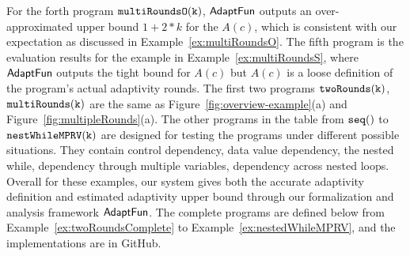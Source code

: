 For the forth program $\mathtt{multiRoundsO(k)}$, $\textsf{AdaptFun}$ outputs an over-approximated upper bound $1 + 2*k$ for the $A(c)$, which is consistent with our expectation as discussed in Example~\ref{ex:multiRoundsO}. 
The fifth program is the evaluation results for the example in Example~\ref{ex:multiRoundsS}, where $\textsf{AdaptFun}$ outputs the tight bound for $A(c)$ but $A(c)$ is a loose definition of the program's actual adaptivity rounds.
%
The first two programs $\mathtt{twoRounds(k)}$, $ \mathtt{multiRounds(k)}$ are the same as Figure~\ref{fig:overview-example}(a) and Figure~\ref{fig:multipleRounds}(a).
The other programs in the table from  $\mathtt{seq()}$ to $ \mathtt{nestWhileMPRV(k)}$ are 
designed for testing the programs under different possible situations.
They contain control dependency, data value dependency,
the nested while, dependency through multiple variables, dependency across nested loops. 
Overall for these examples, our system gives both the accurate adaptivity definition and estimated
adaptivity upper bound through our formalization and analysis framework $\textsf{AdaptFun}$.
The complete programs are defined below from Example~\ref{ex:twoRoundsComplete} to Example~\ref{ex:nestedWhileMPRV},
and the implementations are in GitHub.
